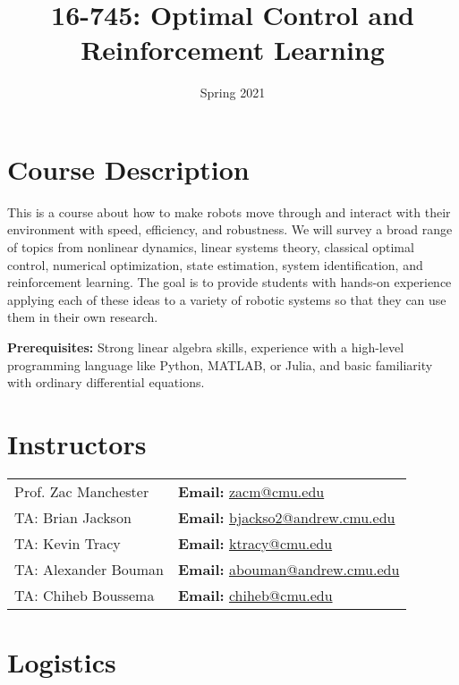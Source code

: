 \documentclass[11pt,letterpaper]{article}
\title{16-745: Optimal Control and Reinforcement Learning}
\author{Spring 2021}
\date{}
\begin{document}
\maketitle

\section*{Course Description}

This is a course about how to make robots move through and interact with their environment with speed, efficiency, and robustness. We will survey a broad range of topics from nonlinear dynamics, linear systems theory, classical optimal control, numerical optimization, state estimation, system identification, and reinforcement learning. The goal is to provide students with hands-on experience applying each of these ideas to a variety of robotic systems so that they can use them in their own research.

\medskip
\noindent
\textbf{Prerequisites:} Strong linear algebra skills, experience with a high-level programming language like Python, MATLAB, or Julia, and basic familiarity with ordinary differential equations.

\section*{Instructors}

\begin{center}
\begin{tabular}{l l}
	Prof. Zac Manchester & \textbf{Email:} \href{mailto:zacm@cmu.edu}{zacm@cmu.edu} \\
	TA: Brian Jackson & \textbf{Email:} \href{mailto:bjackso2@andrew.cmu.edu}{bjackso2@andrew.cmu.edu}
	\\
	TA: Kevin Tracy & \textbf{Email:} \href{mailto:ktracy@cmu.edu}{ktracy@cmu.edu}
	\\
	TA: Alexander Bouman & \textbf{Email:} \href{mailto:abouman@andrew.cmu.edu}{abouman@andrew.cmu.edu}
	\\
	TA: Chiheb Boussema & \textbf{Email:} \href{mailto:chiheb@cmu.edu}{chiheb@cmu.edu}
\end{tabular}
\end{center}

\section*{Logistics}
\end{document}
